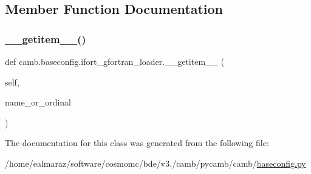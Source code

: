 \subsection{Member Function Documentation}
\mbox{\label{classcamb_1_1baseconfig_1_1ifort__gfortran__loader_a85adcd6901ce884ec29852cabd345900}} 
\subsubsection{\texorpdfstring{\+\_\+\+\_\+getitem\+\_\+\+\_\+()}{\_\_getitem\_\_()}}
{\footnotesize\ttfamily def camb.\+baseconfig.\+ifort\+\_\+gfortran\+\_\+loader.\+\_\+\+\_\+getitem\+\_\+\+\_\+ (\begin{DoxyParamCaption}\item[{}]{self,  }\item[{}]{name\+\_\+or\+\_\+ordinal }\end{DoxyParamCaption})}



The documentation for this class was generated from the following file\+:\begin{DoxyCompactItemize}
\item 
/home/ealmaraz/software/cosmomc/bde/v3./camb/pycamb/camb/\mbox{\hyperlink{baseconfig_8py}{baseconfig.\+py}}\end{DoxyCompactItemize}
